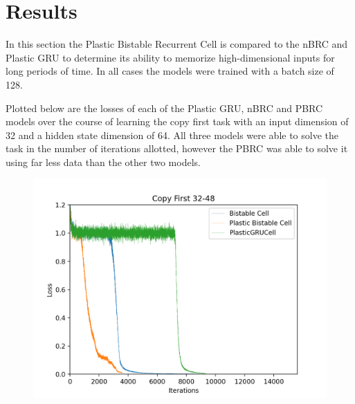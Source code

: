 \section{Results}

In this section the Plastic Bistable Recurrent Cell is compared to the nBRC and Plastic GRU to determine its ability to memorize high-dimensional inputs for long periods of time. In all cases the models were trained with a batch size of 128.

Plotted below are the losses of each of the Plastic GRU, nBRC and PBRC models over the course of learning the copy first task with an input dimension of 32 and a hidden state dimension of 64. All three models were able to solve the task in the number of iterations allotted, however the PBRC was able to solve it using far less data than the other two models.
\begin{figure}[h]
	\centering
	\includegraphics[width=5in]{plots/32_64_plot}
\end{figure}

